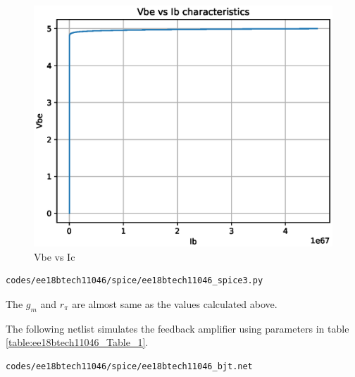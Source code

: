 \begin{enumerate}[label=\arabic*.,ref=\theenumi]
%
\begin{figure}[!ht]
\centering
\includegraphics[width=\columnwidth]{./figs/ee18btech11046/ee18btech11046_3.eps}
\caption{Vbe vs Ic}
\label{fig:ee18btech11046_spice3}
\end{figure}
%

\begin{lstlisting}
codes/ee18btech11046/spice/ee18btech11046_spice3.py
\end{lstlisting}

The $g_{m}$ and $r_{\pi}$ are almost same as the values calculated above.

The following netlist simulates the feedback amplifier using parameters in table \ref{table:ee18btech11046_Table_1}.
\begin{lstlisting}
codes/ee18btech11046/spice/ee18btech11046_bjt.net
\end{lstlisting}


\end{enumerate}
